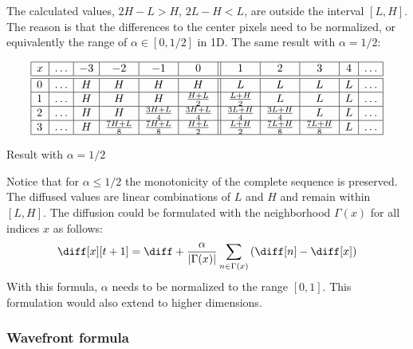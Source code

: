 The calculated values, $2H-L>H$, $2L-H<L$, are outside the interval $[L,H]$.
The reason is that the differences to the center pixels need to be normalized, or
equivalently the range of $\alpha \in [0,1/2]$ in 1D. The same result with $\alpha=1/2$:

\begin{table}[ht]
    \centering
    $$
        \begin{array}{|l|c|c|c|c|c||c|c|c|c|c|} \hline
        x&\ldots&       -3       &       -2       &       -1        &       0         &       1         &       2         &       3        &       4        &\ldots\\\hline \hline
        0&\ldots&        H       &        H       &        H        &       H         &       L         &       L         &       L        &       L        &\ldots\\\hline
        1&\ldots&        H       &        H       &        H        & \frac{H+L}{2}   & \frac{L+H}{2}   &       L         &       L        &       L        &\ldots\\\hline
        2&\ldots&        H       &        H       &  \frac{3H+L}{4} & \frac{3H+L}{4}  & \frac{3L+H}{4}  & \frac{3L+H}{4}  &       L        &       L        &\ldots\\\hline
        3&\ldots&        H       & \frac{7H+L}{8} &  \frac{7H+L}{8} & \frac{H+L}{2}   & \frac{L+H}{2}   & \frac{7L+H}{8}  & \frac{7L+H}{8} &       L        &\ldots\\\hline
        \end{array}
    $$
    \caption{Result with $\alpha=1/2$}
    \label{tab:1D:result_a0d5}
\end{table}

Notice that for $\alpha \le 1/2$ the monotonicity of the complete sequence is preserved.
The diffused values are linear combinations of $L$ and $H$ and remain within $[L,H]$.
The diffusion could be formulated with the neighborhood $\Gamma(x)$ for all indices $x$ 
as follows:
%
\begin{equation}\label{eq:1D:normalized}
    \diff[x][t+1] = \diff + \frac{\alpha}{|\Gamma(x)|} \sum_{n \in \Gamma(x)} \left(\diff[n] - \diff[x]\right)
\end{equation}
%
With this formula, $\alpha$ needs to be normalized to the range $[0,1]$. This formulation 
would also extend to higher dimensions.

\subsubsection{Wavefront formula}

